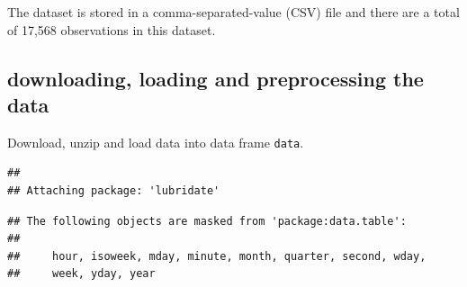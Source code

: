 \documentclass[]{article}
\newenvironment{Shaded}{\begin{snugshade}}{\end{snugshade}}
\newcommand{\KeywordTok}[1]{\textcolor[rgb]{0.13,0.29,0.53}{\textbf{#1}}}
\newcommand{\DataTypeTok}[1]{\textcolor[rgb]{0.13,0.29,0.53}{#1}}
\newcommand{\StringTok}[1]{\textcolor[rgb]{0.31,0.60,0.02}{#1}}
\newcommand{\OtherTok}[1]{\textcolor[rgb]{0.56,0.35,0.01}{#1}}
\newcommand{\ControlFlowTok}[1]{\textcolor[rgb]{0.13,0.29,0.53}{\textbf{#1}}}
\newcommand{\OperatorTok}[1]{\textcolor[rgb]{0.81,0.36,0.00}{\textbf{#1}}}
\newcommand{\NormalTok}[1]{#1}
\begin{document}
The dataset is stored in a comma-separated-value (CSV) file and there
are a total of 17,568 observations in this dataset.

\subsection{downloading, loading and preprocessing the
data}\label{downloading-loading-and-preprocessing-the-data}

Download, unzip and load data into data frame \texttt{data}.

\begin{Shaded}
\end{Shaded}

\begin{verbatim}
## 
## Attaching package: 'lubridate'
\end{verbatim}

\begin{verbatim}
## The following objects are masked from 'package:data.table':
## 
##     hour, isoweek, mday, minute, month, quarter, second, wday,
##     week, yday, year
\end{verbatim}
\end{document}
